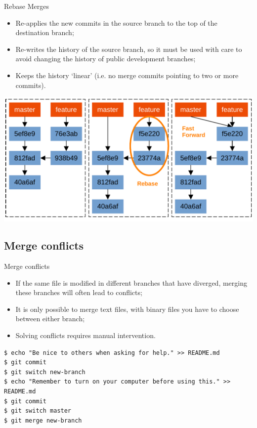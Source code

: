 \documentclass{beamer}
\begin{document}
\begin{frame}{Rebase Merges}
  \begin{itemize}
    \item Re-applies the new commits in the source branch to the top of the destination branch;
    \item Re-writes the history of the source branch, so it must be used with care to avoid changing the history of public development branches;
    \item Keeps the history `linear' (i.e. no merge commits pointing to two or more commits).
  \end{itemize}
  \begin{center}
    \includegraphics[scale=0.5]{git-rebase-merge}
  \end{center}
\end{frame}

\subsection{Merge conflicts}
\begin{frame}{Merge conflicts}
  \begin{itemize}
    \item If the same file is modified in different branches that have diverged, merging these branches will often lead to conflicts;
    \item It is only possible to merge text files, with binary files you have to choose between either branch;
    \item Solving conflicts requires manual intervention.
  \end{itemize}
  \begin{block}{}
    \texttt{\$ echo "Be nice to others when asking for help." >> README.md} \\
    \texttt{\$ git commit} \\
    \texttt{\$ git switch new-branch} \\
    \texttt{\$ echo "Remember to turn on your computer before using this." >> README.md} \\
    \texttt{\$ git commit} \\
    \texttt{\$ git switch master} \\
    \texttt{\$ git merge new-branch}
  \end{block}
\end{frame}
\end{document}

